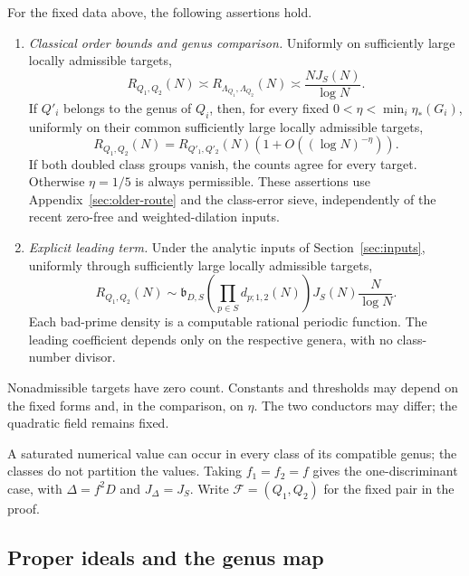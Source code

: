 \begin{theorem}\label{cor:common-field-form-pairs}
For the fixed data above, the following assertions hold.
\begin{enumerate}
\item\label{part:form-classical}\label{thm:genus-binary-invariance}
\emph{Classical order bounds and genus comparison.}
Uniformly on sufficiently large locally admissible targets,
\[
 R_{Q_1,Q_2}(N)\asymp R_{\Lambda_{Q_1},\Lambda_{Q_2}}(N)
                              \asymp\frac{NJ_S(N)}{\log N}.
\]
If \(Q'_i\) belongs to the genus of \(Q_i\), then, for every fixed
\(0<\eta<\min_i\eta_*(G_i)\), uniformly on their common sufficiently
large locally admissible targets,
\[
 R_{Q_1,Q_2}(N)=R_{Q'_1,Q'_2}(N)
                         \left(1+O((\log N)^{-\eta})\right).
\]
If both doubled class groups vanish, the counts agree for every target.
Otherwise \(\eta=1/5\) is always permissible. These assertions use
Appendix~\ref{sec:older-route} and the class-error sieve, independently
of the recent zero-free and weighted-dilation inputs.
\item\label{part:form-leading}\label{thm:form-binary-leading}
\emph{Explicit leading term.}
Under the analytic inputs of Section~\ref{sec:inputs}, uniformly
through sufficiently large locally admissible targets,
\begin{equation}\label{eq:form-binary-leading}
 R_{Q_1,Q_2}(N)\sim
 \mathfrak b_{D,S}\left(\prod_{p\in S}d_{p;1,2}(N)\right)
                              J_S(N)\frac N{\log N}.
\end{equation}
Each bad-prime density is a computable rational periodic function.
The leading coefficient depends only on the respective genera,
with no class-number divisor.
\end{enumerate}
Nonadmissible targets have zero count. Constants and thresholds may
depend on the fixed forms and, in the comparison, on \(\eta\).
The two conductors may differ; the quadratic field remains fixed.
\end{theorem}

A saturated numerical value can occur in every class of its compatible
genus; the classes do not partition the values. Taking \(f_1=f_2=f\)
gives the one-discriminant case, with \(\Delta=f^2D\) and \(J_\Delta=J_S\).
Write \(\mathcal F=(Q_1,Q_2)\) for the fixed pair in the proof.

\subsection{Proper ideals and the genus map}

